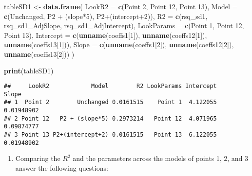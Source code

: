 \documentclass[
]{book}
\newenvironment{Shaded}{\begin{snugshade}}{\end{snugshade}}
\newcommand{\AttributeTok}[1]{\textcolor[rgb]{0.13,0.29,0.53}{#1}}
\newcommand{\DecValTok}[1]{\textcolor[rgb]{0.00,0.00,0.81}{#1}}
\newcommand{\FunctionTok}[1]{\textcolor[rgb]{0.13,0.29,0.53}{\textbf{#1}}}
\newcommand{\NormalTok}[1]{#1}
\newcommand{\OtherTok}[1]{\textcolor[rgb]{0.56,0.35,0.01}{#1}}
\newcommand{\StringTok}[1]{\textcolor[rgb]{0.31,0.60,0.02}{#1}}
\providecommand{\tightlist}{%
  \setlength{\itemsep}{0pt}\setlength{\parskip}{0pt}}
\begin{document}
\begin{Shaded}
\begin{Highlighting}[]
\NormalTok{tableSD1 }\OtherTok{\textless{}{-}} \FunctionTok{data.frame}\NormalTok{(}
  \AttributeTok{LookR2 =} \FunctionTok{c}\NormalTok{(}\StringTok{\textquotesingle{}Point 2\textquotesingle{}}\NormalTok{, }\StringTok{\textquotesingle{}Point 12\textquotesingle{}}\NormalTok{, }\StringTok{\textquotesingle{}Point 13\textquotesingle{}}\NormalTok{),}
  \AttributeTok{Model =} \FunctionTok{c}\NormalTok{(}\StringTok{\textquotesingle{}Unchanged\textquotesingle{}}\NormalTok{, }\StringTok{\textquotesingle{}P2 + (slope*5)\textquotesingle{}}\NormalTok{, }\StringTok{\textquotesingle{}P2+(intercept+2)\textquotesingle{}}\NormalTok{),}
  \AttributeTok{R2 =} \FunctionTok{c}\NormalTok{(rsq\_sd1, rsq\_sd1\_AdjSlope, rsq\_sd1\_AdjIntercept),    }
  \AttributeTok{LookParams =} \FunctionTok{c}\NormalTok{(}\StringTok{\textquotesingle{}Point 1\textquotesingle{}}\NormalTok{, }\StringTok{\textquotesingle{}Point 12\textquotesingle{}}\NormalTok{, }\StringTok{\textquotesingle{}Point 13\textquotesingle{}}\NormalTok{),}
  \AttributeTok{Intercept =} \FunctionTok{c}\NormalTok{(}\FunctionTok{unname}\NormalTok{(coeffs1[}\DecValTok{1}\NormalTok{]), }\FunctionTok{unname}\NormalTok{(coeffs12[}\DecValTok{1}\NormalTok{]), }\FunctionTok{unname}\NormalTok{(coeffs13[}\DecValTok{1}\NormalTok{])),    }
  \AttributeTok{Slope =} \FunctionTok{c}\NormalTok{(}\FunctionTok{unname}\NormalTok{(coeffs1[}\DecValTok{2}\NormalTok{]), }\FunctionTok{unname}\NormalTok{(coeffs12[}\DecValTok{2}\NormalTok{]), }\FunctionTok{unname}\NormalTok{(coeffs13[}\DecValTok{2}\NormalTok{]))}
\NormalTok{)}


\FunctionTok{print}\NormalTok{(tableSD1)}
\end{Highlighting}
\end{Shaded}

\begin{verbatim}
##     LookR2            Model        R2 LookParams Intercept      Slope
## 1  Point 2        Unchanged 0.0161515    Point 1  4.122055 0.01948902
## 2 Point 12   P2 + (slope*5) 0.2973214   Point 12  4.071965 0.09874777
## 3 Point 13 P2+(intercept+2) 0.0161515   Point 13  6.122055 0.01948902
\end{verbatim}

\begin{enumerate}
\def\labelenumi{\arabic{enumi}.}
\setcounter{enumi}{13}
\tightlist
\item
  Comparing the \(R^2\) and the parameters across the models of points 1, 2, and 3 answer the following questions:
\end{enumerate}
\end{document}
